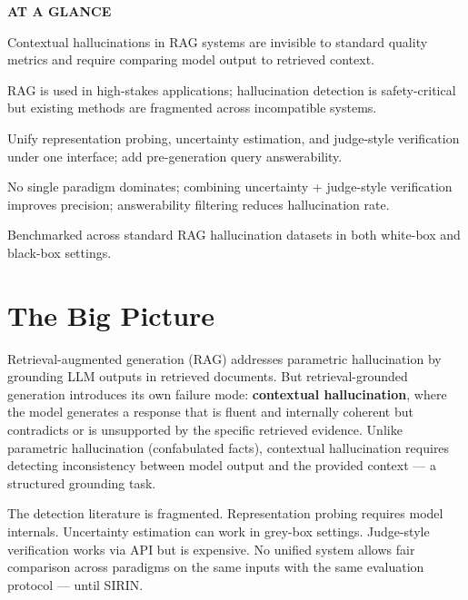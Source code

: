 \documentclass[10pt,twocolumn]{article}
\begin{document}
\begin{mdframed}[backgroundcolor=boxgray,linecolor=rulered,linewidth=1pt,
    innerleftmargin=6pt,innerrightmargin=6pt,
    innertopmargin=6pt,innerbottommargin=6pt]
\textbf{\small AT A GLANCE}\par\vspace{4pt}
\begin{description}[leftmargin=0pt,labelsep=4pt,itemsep=2pt,parsep=0pt,
    font=\small\bfseries]
  \item[Problem:] Contextual hallucinations in RAG systems are invisible to standard
    quality metrics and require comparing model output to retrieved context.
  \item[Why it matters:] RAG is used in high-stakes applications; hallucination detection
    is safety-critical but existing methods are fragmented across incompatible systems.
  \item[Method:] Unify representation probing, uncertainty estimation, and judge-style
    verification under one interface; add pre-generation query answerability.
  \item[Result:] No single paradigm dominates; combining uncertainty + judge-style
    verification improves precision; answerability filtering reduces hallucination rate.
  \item[Evidence:] Benchmarked across standard RAG hallucination datasets in both
    white-box and black-box settings.
\end{description}
\end{mdframed}

\section{The Big Picture}

Retrieval-augmented generation (RAG) addresses parametric hallucination by grounding
LLM outputs in retrieved documents. But retrieval-grounded generation introduces its
own failure mode: \textbf{contextual hallucination}, where the model generates a response
that is fluent and internally coherent but contradicts or is unsupported by the
specific retrieved evidence. Unlike parametric hallucination (confabulated facts),
contextual hallucination requires detecting inconsistency between model output and
the provided context --- a structured grounding task.

The detection literature is fragmented. Representation probing requires model internals.
Uncertainty estimation can work in grey-box settings. Judge-style verification works
via API but is expensive. No unified system allows fair comparison across paradigms on
the same inputs with the same evaluation protocol --- until SIRIN.
\end{document}
